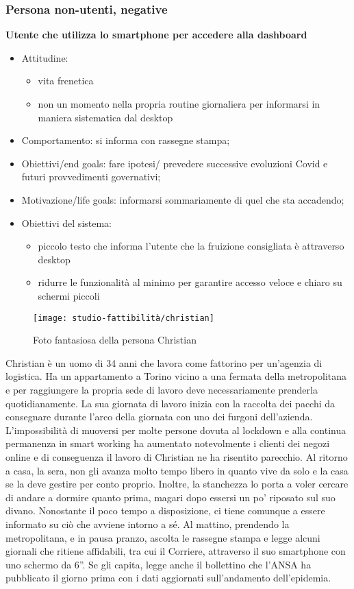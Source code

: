 \subsubsection*{Persona non-utenti, negative}
\textbf{Utente che utilizza lo smartphone per accedere alla dashboard}
\begin{itemize}
	\item Attitudine:
    \begin{itemize}
        \item vita frenetica
        \item non un momento nella propria routine giornaliera per informarsi in maniera sistematica dal desktop
    \end{itemize}
    \item Comportamento: si informa con rassegne stampa;
    \item Obiettivi/end goals: fare ipotesi/ prevedere successive evoluzioni Covid e futuri provvedimenti governativi;
    \item Motivazione/life goals: informarsi sommariamente di quel che sta accadendo;
    \item Obiettivi del sistema:
    \begin{itemize}
        \item piccolo testo che informa l'utente che la fruizione consigliata è attraverso desktop
        \item ridurre le funzionalità al minimo per garantire accesso veloce e chiaro su schermi piccoli
    \end{itemize}
\end{itemize}

\begin{wrapfigure}{l}{8cm}
    \texttt{[image: studio-fattibilità/christian]}
    \caption{Foto fantasiosa della persona Christian}
\end{wrapfigure}

Christian è un uomo di 34 anni che lavora come fattorino per un'agenzia di logistica.
Ha un appartamento a Torino vicino a una fermata della metropolitana e per raggiungere la propria sede di lavoro deve necessariamente prenderla quotidianamente. La sua giornata di lavoro inizia con la raccolta dei pacchi da consegnare durante l'arco della giornata con uno dei furgoni dell'azienda. L'impossibilità di muoversi per molte persone dovuta al lockdown e alla continua permanenza in smart working ha aumentato notevolmente i clienti dei negozi online e di conseguenza il lavoro di Christian ne ha risentito parecchio. Al ritorno a casa, la sera, non gli avanza molto tempo libero in quanto vive da solo e la casa se la deve gestire per conto proprio. Inoltre, la stanchezza lo porta a voler cercare di andare a dormire quanto prima, magari dopo essersi un po' riposato sul suo divano.
Nonostante il poco tempo a disposizione, ci tiene comunque a essere informato su ciò che avviene intorno a sé. Al mattino, prendendo la metropolitana, e in pausa pranzo, ascolta le rassegne stampa e legge alcuni giornali che ritiene affidabili, tra cui il Corriere, attraverso il suo smartphone con uno schermo da 6''. Se gli capita, legge anche il bollettino che l'ANSA ha pubblicato il giorno prima con i dati aggiornati sull'andamento dell'epidemia.


